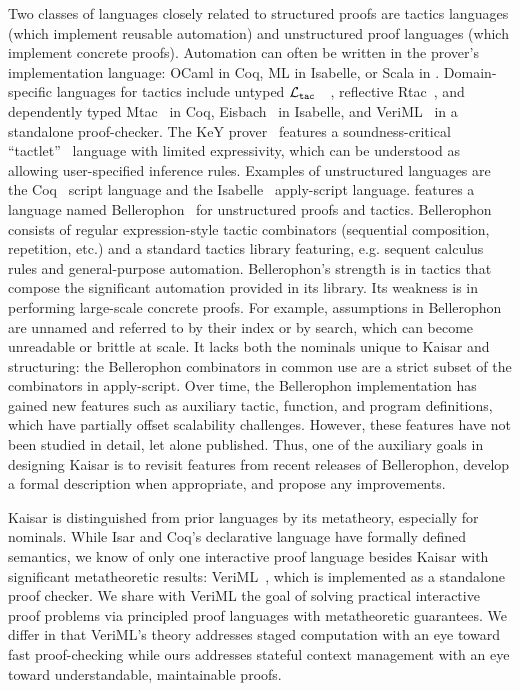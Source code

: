\documentclass[12pt]{cmuthesis}
\theoremstyle{definition}
\theoremstyle{remark}
\newcommand{\ltac}{\ensuremath{\mathcal{L}_{\tt tac}}~}
\begin{document}
Two classes of languages closely related to structured proofs are tactics languages (which implement reusable automation) and unstructured proof languages (which implement concrete proofs).
Automation can often be written in the prover's implementation language: OCaml in Coq, ML in Isabelle, or Scala in \KeYmaeraX.
Domain-specific languages for tactics include untyped \ltac~\cite{Delahaye:2000:TLS:1765236.1765246}, reflective Rtac~\cite{malecha2015rtac-coqpl}, and dependently typed Mtac~\cite{Ziliani:2013:MMT:2544174.2500579} in Coq, Eisbach~\cite{Matichuk:2016:EPM:2904234.2904264} in Isabelle, and VeriML~\cite{DBLP:conf/icfp/StampoulisS10,DBLP:conf/popl/StampoulisS12} in a standalone proof-checker.
The KeY prover~\cite{DBLP:series/lncs/10001} features a soundness-critical ``tactlet''~\cite{habermalz2000interactiv} language with limited expressivity, which can be understood as allowing user-specified inference rules.
Examples of unstructured languages are the Coq~\cite{COQ} script language and the Isabelle~\cite{DBLP:books/sp/NipkowPW02} apply-script language.
\KeYmaeraX features a language named Bellerophon~\cite{DBLP:conf/itp/FultonMBP17} for unstructured proofs and tactics.
Bellerophon consists of regular expression-style tactic combinators (sequential composition, repetition, etc.) and a standard tactics library featuring, e.g. sequent calculus rules and general-purpose automation.
Bellerophon's strength is in tactics that compose the significant automation provided in its library.
Its weakness is in performing large-scale concrete proofs.
For example, assumptions in Bellerophon are unnamed and referred to by their index or by search, which can become unreadable or brittle at scale.
It lacks both the nominals unique to Kaisar and structuring: the Bellerophon combinators in common use are a strict subset of the combinators in apply-script.
Over time, the Bellerophon implementation has gained new features such as auxiliary tactic, function, and program definitions, which have partially offset scalability challenges.
However, these features have not been studied in detail, let alone published.
Thus, one of the auxiliary goals in designing Kaisar is to revisit features from recent releases of Bellerophon, develop a formal description when appropriate, and propose any improvements.


Kaisar is distinguished from prior languages by its metatheory, especially for nominals.
While Isar and Coq's declarative language have formally defined semantics, we know of only one interactive proof language besides Kaisar with significant metatheoretic results:  VeriML~\cite{DBLP:conf/icfp/StampoulisS10,DBLP:conf/popl/StampoulisS12}, which is implemented as a standalone proof checker.
We share with VeriML the goal of solving practical interactive proof problems via principled proof languages with metatheoretic guarantees.
We differ in that VeriML's theory addresses staged computation with an eye toward fast proof-checking  while ours addresses stateful context management with an eye toward understandable, maintainable proofs.
\end{document}
